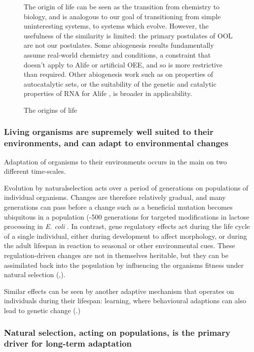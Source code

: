 \begin{figure}
\begin{mdframed}
The origin of life can be seen as the transition from chemistry to biology, and is analogous to our goal of transitioning from simple uninteresting systems, to systems which evolve. However, the usefulness of the similarity is limited: the primary postulates of OOL are not our postulates. Some abiogenesis results fundamentally assume real-world chemistry and
conditions, a constraint that doesn't apply to Alife or artificial OEE, and so is more restrictive than required. Other abiogenesis work such as on properties of autocatalytic sets, or the suitability of the genetic and catalytic properties of RNA for Alife \parencite{Cheng2010}, is broader in applicability.
\end{mdframed}
\captionsetup{name=Box}
\caption{The origins of life}
\label{box:ool}
\end{figure}

\subsubsection{Living organisms are supremely well suited to their environments, and can adapt to environmental changes}

Adaptation of organisms to their environments occurs in the main on two different time-scales.

Evolution by \gls{naturalselection} acts over a period of generations on populations of individual organisms. Changes are therefore relatively gradual, and many generations can pass before a change such as a beneficial mutation becomes ubiquitous in a population (-500 generations for targeted modifications in lactose processing in \emph{E. coli} \parencite{Dekel:2005fk}. In contrast, gene regulatory effects act during the life cycle of a single individual, either during development to affect morphology, or during the adult lifespan in reaction to seasonal or other environmental cues. These regulation-driven changes are not in themselves heritable, but they can be assimilated back into the population by influencing the organisms fitness under natural selection (\eg,\parencite{Baldwin:1896ly,Dennett:2003ve,Paenke:2009xe,Paenke:2007ve}).

Similar effects can be seen by another adaptive mechanism that operates on individuals during their lifespan: learning, where behavioural adaptions can also lead to genetic change (\eg \parencite{Hinton:1987vy}.)

\subsubsection{Natural selection, acting on populations, is the primary driver for long-term adaptation}

